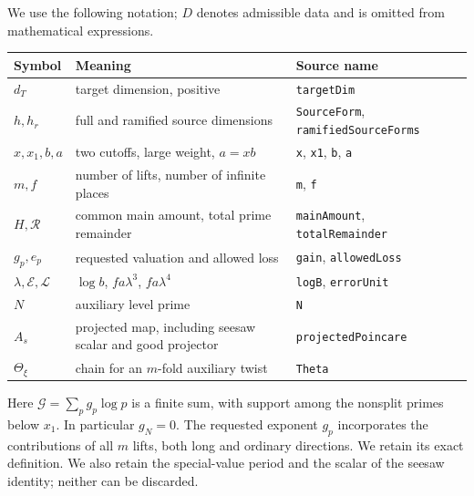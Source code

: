 \documentclass[11pt,letterpaper]{article}
\theoremstyle{remark}\newtheorem{remark}[theorem]{Remark}
\newcommand{\R}{\mathcal R}\newcommand{\E}{\mathcal E}\newcommand{\Lfour}{\mathcal L}\newcommand{\K}{\mathcal K}\newcommand{\G}{\mathcal G}\newcommand{\Gr}{\operatorname{Gram}}\newcommand{\rk}{\operatorname{rank}}\newcommand{\Height}{\operatorname{HeightLe}}
\begin{document}
We use the following notation; $D$ denotes admissible data and is omitted from mathematical expressions.
\begin{center}\small
\begin{tabularx}{\linewidth}{@{}lXl@{}}\toprule
Symbol & Meaning & Source name\\\midrule
$d_T$ & target dimension, positive & \texttt{targetDim}\\
$h,h_r$ & full and ramified source dimensions & \texttt{SourceForm}, \texttt{ramifiedSourceForms}\\
$x,x_1,b,a$ & two cutoffs, large weight, $a=xb$ & \texttt{x}, \texttt{x1}, \texttt{b}, \texttt{a}\\
$m,f$ & number of lifts, number of infinite places & \texttt{m}, \texttt{f}\\
$H,\R$ & common main amount, total prime remainder & \texttt{mainAmount}, \texttt{totalRemainder}\\
$g_p,e_p$ & requested valuation and allowed loss & \texttt{gain}, \texttt{allowedLoss}\\
$\lambda,\E,\Lfour$ & $\log b$, $fa\lambda^3$, $fa\lambda^4$ & \texttt{logB}, \texttt{errorUnit}\\
$N$ & auxiliary level prime & \texttt{N}\\
$A_s$ & projected map, including seesaw scalar and good projector & \texttt{projectedPoincare}\\
$\Theta_\xi$ & chain for an $m$-fold auxiliary twist & \texttt{Theta}\\\bottomrule
\end{tabularx}
\end{center}
Here $\G=\sum_p g_p\log p$ is a finite sum, with support among the nonsplit primes below $x_1$. In particular $g_N=0$. The requested exponent $g_p$ incorporates the contributions of all $m$ lifts, both long and ordinary directions. We retain its exact definition. We also retain the special-value period and the scalar of the seesaw identity; neither can be discarded.
\end{document}
